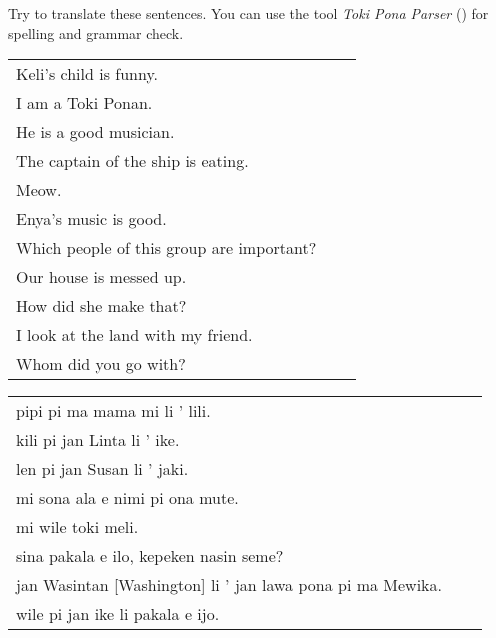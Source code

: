 Try to translate these sentences.
You can use the tool \textit{Toki Pona Parser} (\cite{www:rowa:02}) for spelling and grammar check.

\begin{supertabular}{p{5,5cm}|ll}
    Keli's child is funny.                    \\
    I am a Toki Ponan.                        \\
    He is a good musician.                    \\
    The captain of the ship is eating.        \\
    Meow.                                     \\
    Enya's music is good.                     \\
    Which people of this group are important? \\
    Our house is messed up.                   \\
    How did she make that?                    \\
    I look at the land with my friend. &  &   \\
    Whom did you go with?              &  &   \\
\end{supertabular}

\begin{supertabular}{p{5,5cm}|ll}
    pipi pi ma mama mi li ' lili.                              \\
    kili pi jan Linta li ' ike.                                \\
    len pi jan Susan li ' jaki.                                \\
    mi sona ala e nimi pi ona mute.                            \\
    mi wile toki meli.                                         \\
    sina pakala e ilo, kepeken nasin seme?                     \\
    jan Wasintan [Washington] li ' jan lawa pona pi ma Mewika. \\
    wile pi jan ike li pakala e ijo.                           \\
\end{supertabular}